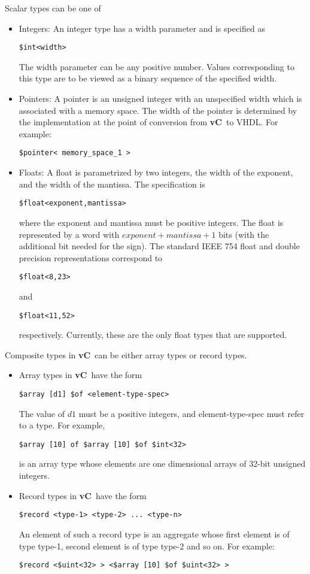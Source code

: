 \documentclass{article}
\newcommand{\vC}{{\bf vC}~}
\begin{document}
Scalar types can be one of 
\begin{itemize}
\item Integers:  An integer type
has a width parameter and is specified as 
\begin{verbatim}
$int<width>
\end{verbatim}
The width parameter can be any positive number.
Values corresponding to this type are to be
viewed as a binary sequence of the specified width.
\item Pointers:  A pointer is an unsigned
integer with an unspecified width which
is associated with a memory space.
The width of the pointer is determined by the
implementation at the point of conversion from
\vC to VHDL.  For example:
\begin{verbatim}
$pointer< memory_space_1 > 
\end{verbatim}
\item Floats: A float is parametrized by
two integers, the width of the exponent,
and the width of the mantissa.  
The specification is
\begin{verbatim}
$float<exponent,mantissa>
\end{verbatim} %
where the exponent and mantissa must be positive
integers.  The float is represented by 
a word with $exponent+mantissa+1$ bits
(with the additional bit needed for the sign).
The standard IEEE 754 float and double
precision representations correspond
to
\begin{verbatim}
$float<8,23> 
\end{verbatim}
and
\begin{verbatim}
$float<11,52> 
\end{verbatim}
respectively.  Currently, these are the
only float types that are supported.
\end{itemize}

Composite types in \vC can be either
array types or record types.
\begin{itemize}
\item 
Array types in \vC have the form
\begin{verbatim}
$array [d1] $of <element-type-spec>
\end{verbatim} %
The value of $d1$ must
be a positive integers, and element-type-spec
must refer to a type.
For example, 
\begin{verbatim}
$array [10] of $array [10] $of $int<32>
\end{verbatim}
is an array type whose
elements are one dimensional arrays of 32-bit
unsigned integers.
\item
Record types in \vC have the form
\begin{verbatim}
$record <type-1> <type-2> ... <type-n>
\end{verbatim}
An element of such a record type is
an aggregate whose first element is of type
type-1, second element is of type type-2 and so on.
For example:
\begin{verbatim}
$record <$uint<32> > <$array [10] $of $uint<32> > 
\end{verbatim}
\end{itemize}
\end{document}
